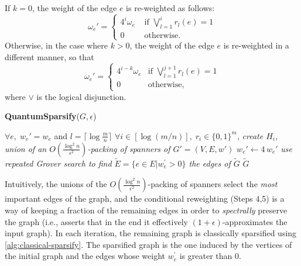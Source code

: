 If $k=0$, the weight of the edge $e$ is re-weighted as follows:
\begin{equation*}
    \omega_e' =
    \begin{cases}
    4^i\omega_e & \text{ if } \bigvee\limits_{l=1}^i r_l(e) = 1 \\
    0 & \text{ otherwise.}
    \end{cases}
\end{equation*}
Otherwise, in the case where $k>0$, the weight of the edge $e$ is re-weighted
in a different manner, so that
\begin{equation*}
    \omega_e' =
    \begin{cases}
    4^{i-k}\omega_e & \text{if } \bigvee\limits_{l=1}^{j+1} r_l(e) = 1 \\
    0 & \text{otherwise,}
    \end{cases}
\end{equation*}
where $\vee$ is the logical disjunction.


\begin{algorithm}[H]
    \caption{\textbf{QuantumSparsify}($G,\epsilon$)}\label{alg:quantum-sparsify}
    \begin{algorithmic}[1]
    \Require $\forall e, \; w_e' = w_e$ and $l=\lceil \log\frac mn \rceil$
    \Require $\forall i\in[\log(m/n)], \; r_i \in \{0,1\}^m$, 
    \State \textit{create $H_i$, union of an $O(\frac{\log^2 n}{\epsilon ^2})$-packing of
    spanners of $G' = (V,E,w')$}
      $w_e' \leftarrow 4\,w_e'$
    \EndIf
    \EndFor \EndFor
    \State \textit{use repeated Grover search to find $\tilde{E} = \{ e \in E | w_e^{'} > 0\}$ the edges of $\tilde{G}$ }
    \State \Return $\tilde{G}$
    \end{algorithmic}
\end{algorithm}

Intuitively, the unions of the $O(\frac{\log^2 n}{\epsilon ^2})$-packing of spanners select the \textit{most} important edges of the graph, and the conditional reweighting (Steps 4,5) is a way of keeping a fraction of the remaining edges in order to \textit{spectrally} preserve the graph (i.e., asserts that in the end it effectively $(1+\epsilon)$-approximates the input graph). In each iteration, the remaining graph is classically sparsified using
\autoref{alg:classical-sparsify}. The sparsified graph is the one induced by the vertices
of the initial graph and the edges whose weight $w_e^{'}$ is greater than $0$.

